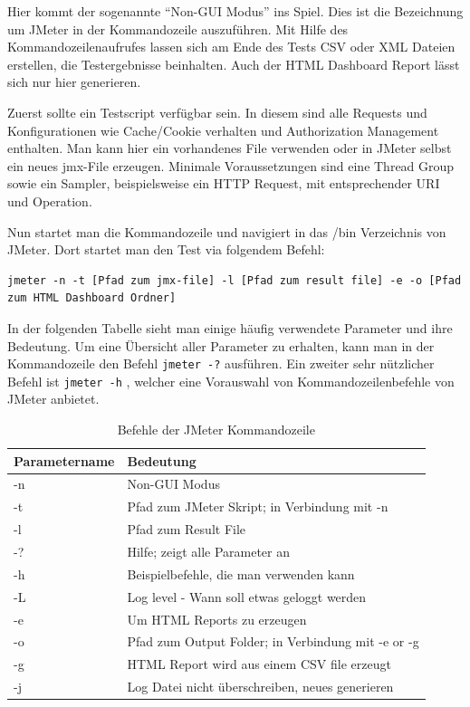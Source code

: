 \documentclass[a4paper,12pt]{article}
\newcommand{\codeInLine}[1]{%
\colorbox{graybackgroundColor}{\lstinline{#1}} %
}
\begin{document}
Hier kommt der sogenannte "`Non-GUI Modus"' ins Spiel. Dies ist die Bezeichnung um JMeter in der Kommandozeile auszuführen. Mit Hilfe des Kommandozeilenaufrufes lassen sich am Ende des Tests CSV oder XML Dateien erstellen, die Testergebnisse beinhalten. Auch der HTML Dashboard Report lässt sich nur hier generieren.

Zuerst sollte ein Testscript verfügbar sein. In diesem sind alle Requests und Konfigurationen wie Cache/Cookie verhalten und Authorization Management enthalten. Man kann hier ein vorhandenes File verwenden oder in JMeter selbst ein neues jmx-File erzeugen. Minimale Voraussetzungen sind eine Thread Group sowie ein Sampler, beispielsweise ein HTTP Request, mit entsprechender URI und Operation.

Nun startet man die Kommandozeile und navigiert in das /bin Verzeichnis von JMeter. Dort startet man den Test via folgendem Befehl:
\begin{lstlisting}
jmeter -n -t [Pfad zum jmx-file] -l [Pfad zum result file] -e -o [Pfad zum HTML Dashboard Ordner]
\end{lstlisting} 
In der folgenden Tabelle sieht man einige häufig verwendete Parameter und ihre Bedeutung. Um eine Übersicht aller Parameter zu erhalten, kann man in der Kommandozeile den Befehl \codeInLine{jmeter -?} ausführen. Ein zweiter sehr nützlicher Befehl ist \codeInLine{jmeter -h}, welcher eine Vorauswahl von Kommandozeilenbefehle von JMeter anbietet.
\begin{table}[H]
	\centering
	\begin{tabular}{|l|l|}
		\hline
		\textbf{Parametername} & \textbf{Bedeutung} \\
		\hline
		-n & Non-GUI Modus \\
		-t & Pfad zum JMeter Skript; in Verbindung mit -n \\
		-l & Pfad zum Result File \\
		-? & Hilfe; zeigt alle Parameter an \\
		-h & Beispielbefehle, die man verwenden kann \\
		-L & Log level - Wann soll etwas geloggt werden \\
		-e & Um HTML Reports zu erzeugen\\
		-o & Pfad zum Output Folder; in Verbindung mit -e or -g \\
		-g & HTML Report wird aus einem CSV file erzeugt \\ 
		-j & Log Datei nicht überschreiben, neues generieren \\
		\hline
	\end{tabular}
	\caption[tab_parameter_non_gui_all]{Befehle der JMeter Kommandozeile}
	\label{tab_parameter_non_gui_all}
\end{table}
\end{document}
